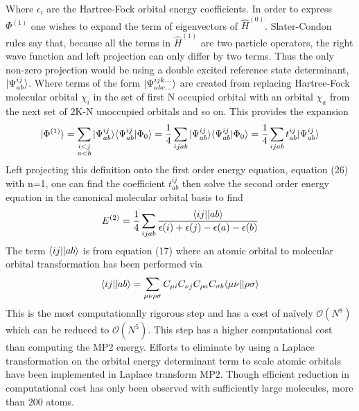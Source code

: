        Where $\epsilon_i$ are the Hartree-Fock orbital energy coefficients. In order to express $\Phi^{(1)}$ one wishes to expand the term of eigenvectors of $\hat{H}^{(0)}$.  Slater-Condon rules\cite{Szabo 1982} say that, because all the terms in $\hat{H}^{(1)}$ are two particle operators, the right wave function and left projection can only differ by two terms.  Thus the only non-zero projection would be using a double excited reference state determinant, $| \Psi^{ij}_{ab} \rangle$. Where terms of the form $| \Psi^{ijk\dots}_{abc\dots} \rangle$ are created from replacing Hartree-Fock molecular orbital $\chi_i$ in the set of first N occupied orbital with an orbital $\chi_a$ from the next set of 2K-N unoccupied orbitals and so on.  This provides the expansion 
         \begin{equation}
          | \Phi^{(1)} \rangle = \sum_{\substack{i<j\\a<b}} | \Psi^{ij}_{ab} \rangle \langle\Psi^{ij}_{ab}|\Phi_0\rangle  = \frac{1}{4} \sum_{ijab} | \Psi^{ij}_{ab} \rangle \langle\Psi^{ij}_{ab}|\Phi_0\rangle = \frac{1}{4}\sum_{ijab} t^{ij}_{ab} | \Psi^{ij}_{ab} \rangle
        \end{equation}
      Left projecting this definition onto the first order energy equation, equation (26) with n=1, one can find the coefficient $t^{ij}_{ab}$ then solve the second order energy equation in the canonical molecular orbital basis to find
        \begin{equation}
          E^{(2)} = \frac{1}{4} \sum_{ijab} \frac{\langle ij || ab \rangle}{\epsilon{(i) + \epsilon(j) - \epsilon(a) - \epsilon(b)}}
        \end{equation}
      The term $\langle ij || ab \rangle$ is from equation (17) where an atomic orbital to molecular orbital transformation has been performed via
        \begin{equation}
          \langle ij || ab \rangle = \sum_{\mu\nu\rho\sigma} C_{\mu i} C_{\nu j} C_{\rho a} C_{\sigma b} \langle\mu \nu | | \rho \sigma \rangle
        \end{equation}
      This is the most computationally rigorous step and has a cost of na{\"i}vely $\mathcal{O}(N^8)$ which can be reduced to $\mathcal{O}(N^5)$.  This step has a higher computational cost than computing the MP2 energy.  Efforts to eliminate by using a Laplace transformation on the orbital energy determinant term to scale atomic orbitals have been implemented in Laplace transform MP2\cite{almof 1991, Haser 1992}.  Though efficient reduction in computational cost has only been observed with sufficiently large molecules, more than 200 atoms.
        
